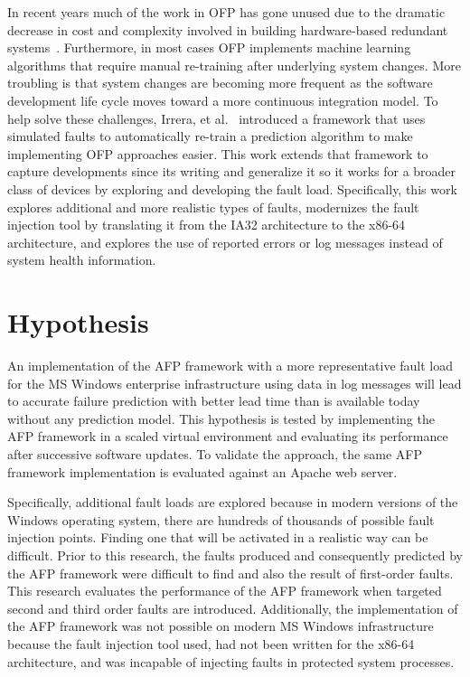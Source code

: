 In recent years much of the work in \ac{OFP} has gone unused due to the
dramatic decrease in cost and complexity involved in building hardware-based
redundant systems~\cite{irrera2015}.  Furthermore, in most cases \ac{OFP}
implements machine learning algorithms that require manual re-training after
underlying system changes.  More troubling is that system changes are becoming
more frequent as the software development life cycle moves toward a more
continuous integration model.  To help solve these challenges, Irrera, et
al.~\cite{irrera2015} introduced a framework that uses simulated faults to
automatically re-train a prediction algorithm to make implementing \ac{OFP}
approaches easier.  This work extends that framework to capture developments
since its writing and generalize it so it works for a broader class of devices
by exploring and developing the fault load.  Specifically, this work explores
additional and more realistic types of faults, modernizes the fault
injection tool by translating it from the IA32 architecture to the x86-64
architecture, and explores the use of reported errors or log messages instead
of system health information.

\section{Hypothesis}
An implementation of the \ac{AFP} framework with a more representative fault
load for the \ac{MS} Windows enterprise infrastructure using data in log
messages will lead to accurate failure prediction with better lead time than is
available today without any prediction model.  This hypothesis is tested by
implementing the \ac{AFP} framework in a scaled virtual environment and
evaluating its performance after successive software updates.  To validate the
approach, the same \ac{AFP} framework implementation is evaluated against an
Apache web server.

Specifically, additional fault loads are explored because in modern versions of
the Windows operating system, there are hundreds of thousands of possible fault
injection points.  Finding one that will be activated in a realistic way can be
difficult.  Prior to this research, the faults produced and consequently
predicted by the \ac{AFP} framework were difficult to find and also the result
of first-order faults.  This research evaluates the performance of the \ac{AFP}
framework when targeted second and third order faults are introduced.
Additionally, the implementation of the \ac{AFP} framework was not possible on
modern \ac{MS} Windows infrastructure because the fault injection tool used,
had not been written for the x86-64 architecture, and was incapable of
injecting faults in protected system processes.  

